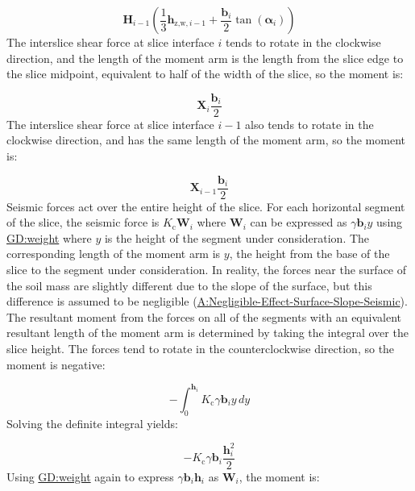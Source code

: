 \documentclass[12pt]{article}
\begin{document}
\begin{displaymath}
{\symbf{H}}_{i-1} \left(\frac{1}{3} {\symbf{h}_{\text{z,w},i-1}}+\frac{{\symbf{b}}_{i}}{2} \tan\left({\symbf{α}}_{i}\right)\right)
\end{displaymath}
The interslice shear force at slice interface $i$ tends to rotate in the clockwise direction, and the length of the moment arm is the length from the slice edge to the slice midpoint, equivalent to half of the width of the slice, so the moment is:

\begin{displaymath}
{\symbf{X}}_{i} \frac{{\symbf{b}}_{i}}{2}
\end{displaymath}
The interslice shear force at slice interface $i-1$ also tends to rotate in the clockwise direction, and has the same length of the moment arm, so the moment is:

\begin{displaymath}
{\symbf{X}}_{i-1} \frac{{\symbf{b}}_{i}}{2}
\end{displaymath}
Seismic forces act over the entire height of the slice. For each horizontal segment of the slice, the seismic force is ${K_{\text{c}}} {\symbf{W}}_{i}$ where ${\symbf{W}}_{i}$ can be expressed as $γ {\symbf{b}}_{i} y$ using \hyperref[GD:weight]{GD:weight} where $y$ is the height of the segment under consideration. The corresponding length of the moment arm is $y$, the height from the base of the slice to the segment under consideration. In reality, the forces near the surface of the soil mass are slightly different due to the slope of the surface, but this difference is assumed to be negligible (\hyperref[assumpNESSS]{A:Negligible-Effect-Surface-Slope-Seismic}). The resultant moment from the forces on all of the segments with an equivalent resultant length of the moment arm is determined by taking the integral over the slice height. The forces tend to rotate in the counterclockwise direction, so the moment is negative:

\begin{displaymath}
-\int_{0}^{{\symbf{h}}_{i}}{{K_{\text{c}}} γ {\symbf{b}}_{i} y}\,dy
\end{displaymath}
Solving the definite integral yields:

\begin{displaymath}
-{K_{\text{c}}} γ {\symbf{b}}_{i} \frac{{\symbf{h}}_{i}^{2}}{2}
\end{displaymath}
Using \hyperref[GD:weight]{GD:weight} again to express $γ {\symbf{b}}_{i} {\symbf{h}}_{i}$ as ${\symbf{W}}_{i}$, the moment is:
\end{document}
